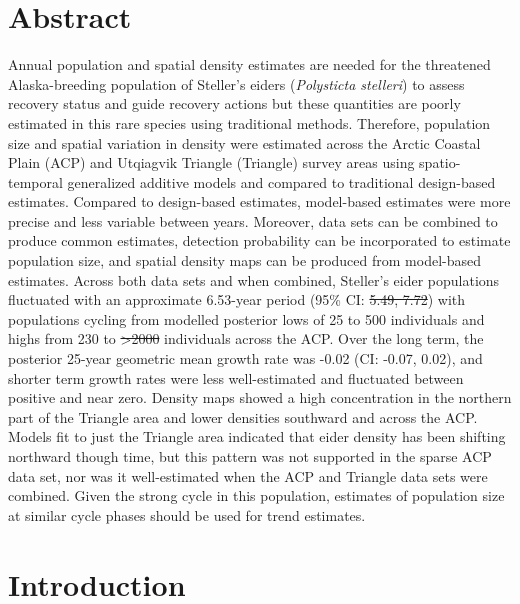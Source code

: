 \documentclass[
  10pt,
  letterpaper,
]{article}
\makeatletter
\providecommand{\DIFaddtex}[1]{{\protect\color{blue}\uwave{#1}}} %
\providecommand{\DIFdeltex}[1]{{\protect\color{red}\sout{#1}}} %
\providecommand{\DIFaddbegin}{} %
\providecommand{\DIFaddend}{} %
\providecommand{\DIFdelbegin}{} %
\providecommand{\DIFdelend}{} %
\providecommand{\DIFadd}[1]{\texorpdfstring{\DIFaddtex{#1}}{#1}} %
\providecommand{\DIFdel}[1]{\texorpdfstring{\DIFdeltex{#1}}{}} %
\providecommand{\DIFscaledelfig}{0.5}
\newlength{\DIFdelgraphicswidth} %
\newlength{\DIFdelgraphicsheight} %
\providecommand{\DIFaddincludegraphics}[2][]{{\color{blue}\fbox{\DIFOincludegraphics[#1]{#2}}}} %
\providecommand{\DIFdelincludegraphics}[2][]{%
\sbox{\DIFdelgraphicsbox}{\DIFOincludegraphics[#1]{#2}}%
\settoboxwidth{\DIFdelgraphicswidth}{\DIFdelgraphicsbox} %
\settoboxtotalheight{\DIFdelgraphicsheight}{\DIFdelgraphicsbox} %
\scalebox{\DIFscaledelfig}{%
\parbox[b]{\DIFdelgraphicswidth}{\usebox{\DIFdelgraphicsbox}\\[-\baselineskip] \rule{\DIFdelgraphicswidth}{0em}}\llap{\resizebox{\DIFdelgraphicswidth}{\DIFdelgraphicsheight}{%
\setlength{\unitlength}{\DIFdelgraphicswidth}%
\begin{picture}(1,1)%
\thicklines\linethickness{2pt} %
{\color[rgb]{1,0,0}\put(0,0){\framebox(1,1){}}}%
{\color[rgb]{1,0,0}\put(0,0){\line( 1,1){1}}}%
{\color[rgb]{1,0,0}\put(0,1){\line(1,-1){1}}}%
\end{picture}%
}\hspace*{3pt}}} %
} %
\DeclareRobustCommand{\DIFaddbegin}{\DIFOaddbegin \let\includegraphics\DIFaddincludegraphics} %
\DeclareRobustCommand{\DIFaddend}{\DIFOaddend \let\includegraphics\DIFOincludegraphics} %
\DeclareRobustCommand{\DIFdelbegin}{\DIFOdelbegin \let\includegraphics\DIFdelincludegraphics} %
\DeclareRobustCommand{\DIFdelend}{\DIFOaddend \let\includegraphics\DIFOincludegraphics} %
\let\sout@orig\sout %
\renewcommand{\sout}[1]{\ifmmode\text{\sout@orig{\ensuremath{#1}}}\else\sout@orig{#1}\fi} %
\makeatother
\begin{document}
\section*{Abstract}
Annual population and spatial density estimates are needed for the
threatened Alaska-breeding population of Steller's eiders
(\emph{Polysticta stelleri}) to assess recovery status and guide
recovery actions but these quantities are poorly estimated in this rare
species using traditional methods. Therefore, population size and
spatial variation in density were estimated across the Arctic Coastal
Plain (ACP) and Utqiagvik Triangle (Triangle) survey areas using
spatio-temporal generalized additive models and compared to traditional
design-based estimates. Compared to design-based estimates, model-based
estimates were more precise and less variable between years. Moreover,
data sets can be combined to produce common estimates, detection
probability can be incorporated to estimate population size, and spatial
density maps can be produced from model-based estimates. Across both
data sets and when combined, Steller's eider populations fluctuated with
an approximate 6.53-year period (95\% CI: \DIFdelbegin \DIFdel{5.49, 7.72}\DIFdelend \DIFaddbegin \DIFadd{5.46, 7.93}\DIFaddend ) with populations
cycling from modelled posterior lows of 25 to 500 individuals and highs
from 230 to \DIFdelbegin \DIFdel{\textgreater2000 }\DIFdelend \DIFaddbegin \DIFadd{\textgreater 2000 }\DIFaddend individuals across the ACP. Over the long
term, the posterior 25-year geometric mean growth rate was -0.02 (\DIFaddbegin \DIFadd{95\% }\DIFaddend CI:
-0.07, 0.02), and shorter term growth rates were less well-estimated and
fluctuated between positive and near zero. Density maps showed a high
concentration in the northern part of the Triangle area and lower
densities southward and across the ACP. Models fit to just the Triangle
area indicated that eider density has been shifting northward though
time, but this pattern was not supported in the sparse ACP data set, nor
was it well-estimated when the ACP and Triangle data sets were combined.
Given the strong cycle in this population, estimates of population size
at similar cycle phases should be used for trend estimates.

\linenumbers

\section{Introduction}\label{introduction}
\end{document}
